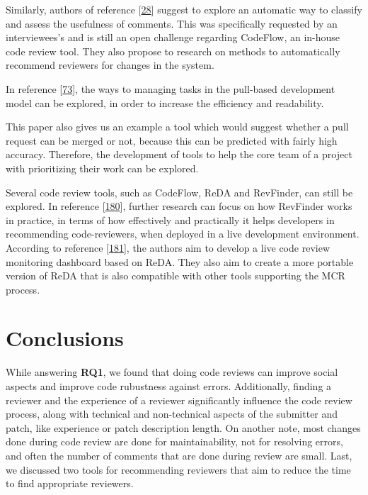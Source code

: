 \documentclass[]{book}
\begin{document}
Similarly, authors of reference
{[}\protect\hyperlink{ref-bird2015lessons}{28}{]} suggest to explore an
automatic way to classify and assess the usefulness of comments. This
was specifically requested by an interviewees's and is still an open
challenge regarding CodeFlow, an in-house code review tool. They also
propose to research on methods to automatically recommend reviewers for
changes in the system.

In reference {[}\protect\hyperlink{ref-gousios2014exploratory}{73}{]},
the ways to managing tasks in the pull-based development model can be
explored, in order to increase the efficiency and readability.

This paper also gives us an example a tool which would suggest whether a
pull request can be merged or not, because this can be predicted with
fairly high accuracy. Therefore, the development of tools to help the
core team of a project with prioritizing their work can be explored.

Several code review tools, such as CodeFlow, ReDA and RevFinder, can
still be explored. In reference
{[}\protect\hyperlink{ref-thongtanunam2015should}{180}{]}, further
research can focus on how RevFinder works in practice, in terms of how
effectively and practically it helps developers in recommending
code-reviewers, when deployed in a live development environment.
According to reference
{[}\protect\hyperlink{ref-thongtanunam2014reda}{181}{]}, the authors aim
to develop a live code review monitoring dashboard based on ReDA. They
also aim to create a more portable version of ReDA that is also
compatible with other tools supporting the MCR process.

\section{Conclusions}\label{conclusions}

While answering \textbf{RQ1}, we found that doing code reviews can
improve social aspects and improve code rubustness against errors.
Additionally, finding a reviewer and the experience of a reviewer
significantly influence the code review process, along with technical
and non-technical aspects of the submitter and patch, like experience or
patch description length. On another note, most changes done during code
review are done for maintainability, not for resolving errors, and often
the number of comments that are done during review are small. Last, we
discussed two tools for recommending reviewers that aim to reduce the
time to find appropriate reviewers.
\end{document}
